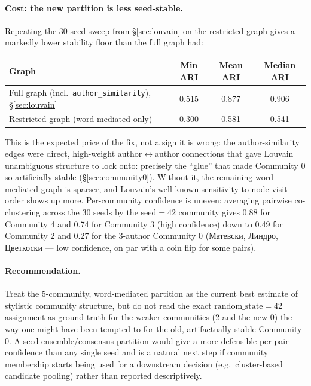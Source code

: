 \documentclass[11pt]{article}
\begin{document}
\paragraph{Cost: the new partition is less seed-stable.} Repeating the
30-seed sweep from \S\ref{sec:louvain} on the restricted graph gives a
markedly lower stability floor than the full graph had:

\begin{center}
\begin{tabular}{lccc}
\toprule
Graph & Min ARI & Mean ARI & Median ARI \\
\midrule
Full graph (incl.\ \texttt{author\_similarity}), \S\ref{sec:louvain} & 0.515 & 0.877 & 0.906 \\
Restricted graph (word-mediated only) & 0.300 & 0.581 & 0.541 \\
\bottomrule
\end{tabular}
\end{center}

This is the expected price of the fix, not a sign it is wrong: the
author-similarity edges were direct, high-weight author$\leftrightarrow$author
connections that gave Louvain unambiguous structure to lock onto: precisely
the ``glue'' that made Community 0 so artificially stable
(\S\ref{sec:community0}). Without it, the remaining word-mediated graph is
sparser, and Louvain's well-known sensitivity to node-visit order shows up
more. Per-community confidence is uneven: averaging pairwise co-clustering
across the 30 seeds by the $\text{seed}=42$ community gives 0.88 for
Community 4 and 0.74 for Community 3 (high confidence) down to 0.49 for
Community 2 and 0.27 for the 3-author Community 0 (Матевски, Линдро,
Цветкоски — low confidence, on par with a coin flip for some pairs).

\paragraph{Recommendation.} Treat the 5-community, word-mediated partition
as the current best estimate of stylistic community structure, but do not
read the exact $\text{random\_state}=42$ assignment as ground truth for the
weaker communities (2 and the new 0) the way one might have been tempted to
for the old, artifactually-stable Community 0. A seed-ensemble/consensus
partition would give a more defensible per-pair confidence than any single
seed and is a natural next step if community membership starts being used
for a downstream decision (e.g.\ cluster-based candidate pooling) rather
than reported descriptively.
\end{document}
